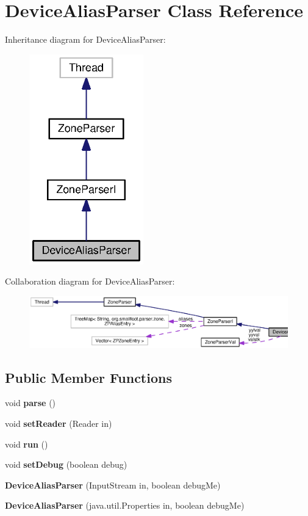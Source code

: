 \section{Device\+Alias\+Parser Class Reference}
\label{classorg_1_1smallfoot_1_1parser_1_1zone_1_1DeviceAliasParser}


Inheritance diagram for Device\+Alias\+Parser\+:\nopagebreak
\begin{figure}[H]
\begin{center}
\leavevmode
\includegraphics[width=140pt]{classorg_1_1smallfoot_1_1parser_1_1zone_1_1DeviceAliasParser__inherit__graph}
\end{center}
\end{figure}


Collaboration diagram for Device\+Alias\+Parser\+:\nopagebreak
\begin{figure}[H]
\begin{center}
\leavevmode
\includegraphics[width=350pt]{classorg_1_1smallfoot_1_1parser_1_1zone_1_1DeviceAliasParser__coll__graph}
\end{center}
\end{figure}
\subsection*{Public Member Functions}
\begin{DoxyCompactItemize}
\item 
void {\bf parse} ()
\item 
void {\bf set\+Reader} (Reader in)
\item 
void {\bf run} ()
\item 
void {\bf set\+Debug} (boolean debug)
\item 
{\bf Device\+Alias\+Parser} (Input\+Stream in, boolean debug\+Me)
\item 
{\bf Device\+Alias\+Parser} (java.\+util.\+Properties in, boolean debug\+Me)
\end{DoxyCompactItemize}
